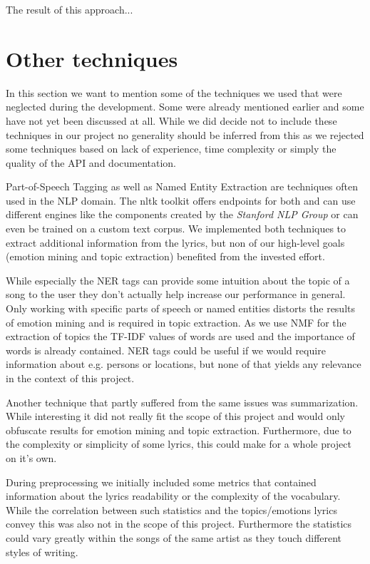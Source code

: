 \documentclass[10pt,a4paper]{article}
\begin{document}
		The result of this approach...
	
	\section{Other techniques}
	\label{sec:othertechniques}
	In this section we want to mention some of the techniques we used that were neglected during the development. Some were already mentioned earlier and some have not yet been discussed at all. While we did decide not to include these techniques in our project no generality should be inferred from this as we rejected some techniques based on lack of experience, time complexity or simply the quality of the API and documentation.
	
	Part-of-Speech Tagging as well as Named Entity Extraction are techniques often used in the NLP domain. The nltk toolkit offers endpoints for both and can use different engines like the components created by the \textit{Stanford NLP Group} or can even be trained on a custom text corpus. We implemented both techniques to extract additional information from the lyrics, but non of our high-level goals (emotion mining and topic extraction) benefited from the invested effort. 
	
	While especially the NER tags can provide some intuition about the topic of a song to the user they don't actually help increase our performance in general. Only working with specific parts of speech or named entities distorts the results of emotion mining and is required in topic extraction. As we use NMF for the extraction of topics the TF-IDF values of words are used and the importance of words is already contained. NER tags could be useful if we would require information about e.g. persons or locations, but none of that yields any relevance in the context of this project.
	
	Another technique that partly suffered from the same issues was summarization. While interesting it did not really fit the scope of this project and would only obfuscate results for emotion mining and topic extraction. Furthermore, due to the complexity or simplicity of some lyrics, this could make for a whole project on it's own.
	
	During preprocessing we initially included some metrics that contained information about the lyrics readability or the complexity of the vocabulary. While the correlation between such statistics and the topics/emotions lyrics convey this was also not in the scope of this project. Furthermore the statistics could vary greatly within the songs of the same artist as they touch different styles of writing.
	
\end{document}
